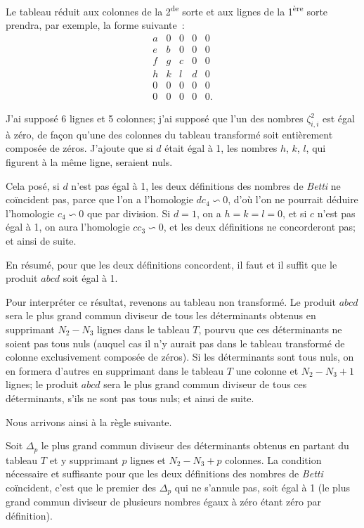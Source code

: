 \documentclass{article}
\begin{document}
Le tableau réduit aux colonnes de la 2\textsuperscript{de} sorte et aux lignes de la 1\textsuperscript{ère} sorte prendra, par exemple, la forme suivante~:
\[ \begin{matrix} a & 0 & 0 & 0 & 0 \\[1ex] e & b & 0 & 0 & 0 \\[1ex] f & g & c & 0 & 0 \\[1ex] h & k & l & d & 0 \\[1ex] 0 & 0 & 0 & 0 & 0 \\[1ex] 0 & 0 & 0 & 0 & 0. \end{matrix} \]


J'ai supposé 6 lignes et 5 colonnes; j'ai supposé que l'un des nombres $\zeta^{2}_{i,i}$ est égal à zéro, de façon qu'une des colonnes du tableau transformé soit entièrement composée de zéros. J'ajoute que si $d$ était égal à 1, les nombres $h$, $k$, $l$, qui figurent à la même ligne, seraient nuls.

Cela posé, si $d$ n'est pas égal à 1, les deux définitions des nombres de \emph{Betti} ne coïncident pas, parce que l'on a l'homologie $dc_{4} \backsim 0$, d'où l'on ne pourrait déduire l'homologie $c_{4} \backsim 0$ que par division. Si $d = 1$, on a $h = k = l = 0$, et si $c$ n'est pas égal à 1, on aura l'homologie $cc_{3} \backsim 0$, et les deux définitions ne concorderont pas; et ainsi de suite.

En résumé, pour que les deux définitions concordent, il faut et il suffit que le produit $abcd$ soit égal à 1.

Pour interpréter ce résultat, revenons au tableau non transformé. Le produit $abcd$ sera le plus grand commun diviseur de tous les déterminants obtenus en supprimant $N_{2} - N_{3}$ lignes dans le tableau $T$, pourvu que ces déterminants ne soient pas tous nuls (auquel cas il n'y aurait pas dans le tableau transformé de colonne exclusivement composée de zéros). Si les déterminants sont tous nuls, on en formera d'autres en supprimant dans le tableau $T$ une colonne et $N_{2} - N_{3} + 1$ lignes; le produit $abcd$ sera le plus grand commun diviseur de tous ces déterminants, s'ils ne sont pas tous nuls; et ainsi de suite.

Nous arrivons ainsi à la règle suivante.

Soit $\Delta_{p}$ le plus grand commun diviseur des déterminants obtenus en partant du tableau $T$ et y supprimant $p$ lignes et $N_{2} - N_{3} + p$ colonnes. La condition nécessaire et suffisante pour que les deux définitions des nombres de \emph{Betti} coïncident, c'est que le premier des $\Delta_{p}$ qui ne s'annule pas, soit égal à 1 (le plus grand commun diviseur de plusieurs nombres égaux à zéro étant zéro par définition).
\end{document}
